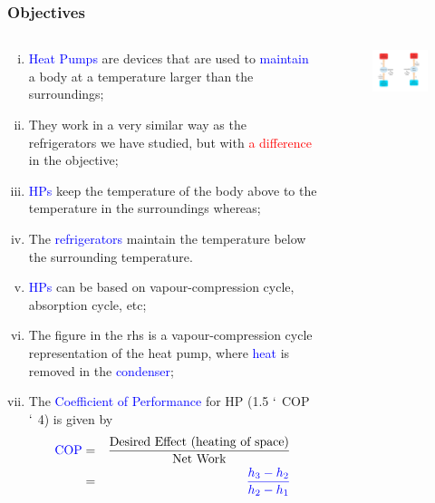 \documentclass[10pt,compress]{beamer}
\newcommand{\frc}{\displaystyle\frac}
\begin{document}
\begin{frame}
 \frametitle{Objectives}
  \begin{columns}
   \begin{column}[c]{0.45\linewidth}
  \begin{enumerate}[(i)]\scriptsize
   \item <1-> \textcolor{blue}{Heat Pumps} are devices that are used to \textcolor{blue}{maintain} a body at a temperature larger than the surroundings;
   \item <2-> They work in a very similar way as the refrigerators we have studied, but with \textcolor{red}{a difference} in the objective;
   \item <3-> \textcolor{blue}{HPs} keep the temperature of the body above to the temperature in the surroundings whereas;
   \item <4-> The \textcolor{blue}{refrigerators} maintain the temperature below the surrounding temperature.
   \item <5-> \textcolor{blue}{HPs} can be based on vapour-compression cycle, absorption cycle, etc;
   \item <6-> The figure in the rhs is a vapour-compression cycle representation of the heat pump, where \textcolor{blue}{heat} is removed in the \textcolor{blue}{condenser};
   \item <7-> The \textcolor{blue}{Coefficient of Performance} for HP (1.5 $\lq$ COP $\lq$ 4) is given by
    \begin{eqnarray}
     \textcolor{blue}{\text{COP}} &=& \frc{\text{Desired Effect (heating of space)}}{\text{Net Work}} \nonumber \\
                                  &=& \textcolor{blue}{\frc{h_{3}-h_{2}}{h_{2}-h_{1}}}
    \end{eqnarray}
  \end{enumerate}
   \end{column}
   \begin{column}[c]{0.55\linewidth}
    \begin{figure}%
     \begin{center}
      \includegraphics[width=6.5cm,clip]{./Pics/Overview_Refrig2} \\

\end{center}
\end{figure}
\end{column}
\end{columns}
\end{frame}
\end{document}
